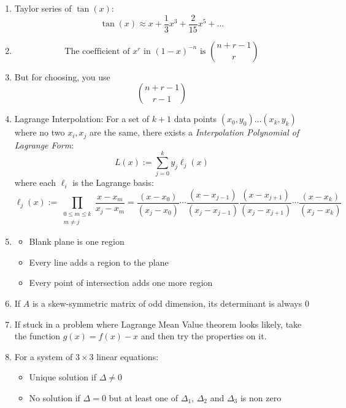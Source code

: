 \documentclass{article}
\numberwithin{equation}{section}
\numberwithin{figure}{section}
\newcommand{\Cr}{\times}
\begin{document}
\begin{enumerate}
	\item Taylor series of $\tan(x)$:\begin{equation} \tan(x)\approx x+\frac{1}{3}x^3+\frac{2}{15}x^5+\dots\end{equation}
		\item \begin{equation} \text{The coefficient of } x^r \text{ in } (1-x)^{-n} \text{ is } {{n+r-1} \choose {r}} \end{equation} 
		\item But for choosing, you use $${{n+r-1} \choose {r-1}} $$ 
		\item Lagrange Interpolation:
			For a set of $k+1$ data points $(x_0,y_0)\dots (x_k,y_k)$ where no two $x_i, x_j$ are the same, there exists a \emph{Interpolation Polynomial of Lagrange Form}:
			\begin{equation}
				L(x):=\sum_{j=0}^{k} y_j \ell_j(x)
			\end{equation}
			where each $\ell_i$ is the Lagrange basis:
			\begin{equation}
				\ell _{j}(x):=\prod _{\begin{smallmatrix}0\leq m\leq k\\m\neq j\end{smallmatrix}}{\frac {x-x_{m}}{x_{j}-x_{m}}}={\frac {(x-x_{0})}{(x_{j}-x_{0})}}\cdots {\frac {(x-x_{j-1})}{(x_{j}-x_{j-1})}}{\frac {(x-x_{j+1})}{(x_{j}-x_{j+1})}}\cdots {\frac {(x-x_{k})}{(x_{j}-x_{k})}}
			\end{equation}
		\item   \begin{itemize}
			\item	Blank plane is one region 
			\item	Every line adds a region to the plane 
			\item	Every point of intersection adds one more region
			\end{itemize}
		\item   If $A$ is a skew-symmetric matrix of odd dimension, its determinant is always $0$ 
		\item If stuck in a problem where Lagrange Mean Value theorem looks likely, take the function $g(x)=f(x)-x$ and then try the properties on it.
		\item For a system of $3\Cr3$ linear equations:
			\begin{itemize}
				\item Unique solution if $\Delta\neq 0$
				\item No solution if $\Delta = 0$ but at least one of $\Delta_1$, $\Delta_2$ and $\Delta_3$ is non zero

\end{itemize}
\end{enumerate}
\end{document}
